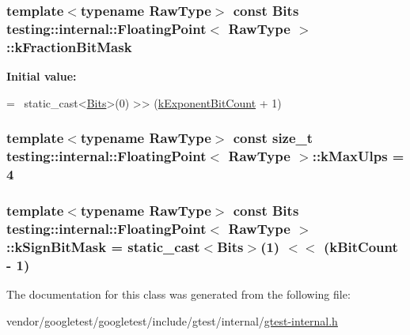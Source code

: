 \subsubsection[{\texorpdfstring{k\+Fraction\+Bit\+Mask}{kFractionBitMask}}]{\setlength{\rightskip}{0pt plus 5cm}template$<$typename Raw\+Type$>$ const {\bf Bits} {\bf testing\+::internal\+::\+Floating\+Point}$<$ Raw\+Type $>$\+::k\+Fraction\+Bit\+Mask\hspace{0.3cm}{\ttfamily [static]}}\hypertarget{classtesting_1_1internal_1_1FloatingPoint_a0ac75d4ffd24f14bca452abe8a718da1}{}\label{classtesting_1_1internal_1_1FloatingPoint_a0ac75d4ffd24f14bca452abe8a718da1}
{\bfseries Initial value\+:}
\begin{DoxyCode}
=
    ~static\_cast<\hyperlink{classtesting_1_1internal_1_1FloatingPoint_abf228bf6cd48f12c8b44c85b4971a731}{Bits}>(0) >> (\hyperlink{classtesting_1_1internal_1_1FloatingPoint_a1973d843c00781053d3073daa8a40119}{kExponentBitCount} + 1)
\end{DoxyCode}
\subsubsection[{\texorpdfstring{k\+Max\+Ulps}{kMaxUlps}}]{\setlength{\rightskip}{0pt plus 5cm}template$<$typename Raw\+Type$>$ const size\+\_\+t {\bf testing\+::internal\+::\+Floating\+Point}$<$ Raw\+Type $>$\+::k\+Max\+Ulps = 4\hspace{0.3cm}{\ttfamily [static]}}\hypertarget{classtesting_1_1internal_1_1FloatingPoint_aac498b3714d93f8e88cdc30e4c5935f6}{}\label{classtesting_1_1internal_1_1FloatingPoint_aac498b3714d93f8e88cdc30e4c5935f6}
\subsubsection[{\texorpdfstring{k\+Sign\+Bit\+Mask}{kSignBitMask}}]{\setlength{\rightskip}{0pt plus 5cm}template$<$typename Raw\+Type$>$ const {\bf Bits} {\bf testing\+::internal\+::\+Floating\+Point}$<$ Raw\+Type $>$\+::k\+Sign\+Bit\+Mask = static\+\_\+cast$<${\bf Bits}$>$(1) $<$$<$ ({\bf k\+Bit\+Count} -\/ 1)\hspace{0.3cm}{\ttfamily [static]}}\hypertarget{classtesting_1_1internal_1_1FloatingPoint_aca98b5ea6f2222a66a82e52421682efa}{}\label{classtesting_1_1internal_1_1FloatingPoint_aca98b5ea6f2222a66a82e52421682efa}


The documentation for this class was generated from the following file\+:\begin{DoxyCompactItemize}
\item 
vendor/googletest/googletest/include/gtest/internal/\hyperlink{gtest-internal_8h}{gtest-\/internal.\+h}\end{DoxyCompactItemize}
